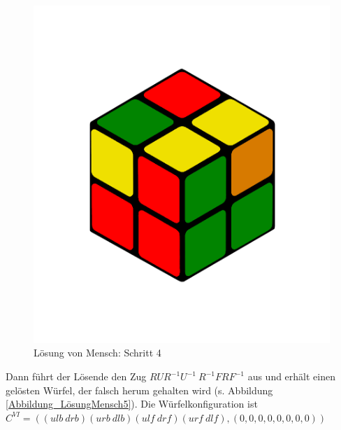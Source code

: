 \documentclass[12pt,a4paper, usenames, dvipsnames]{article}
\theoremstyle{mystyle}
\theoremstyle{definition}
\begin{document}
\begin{figure}[H]
\centering
\includegraphics[scale=0.12]{menschSchritt4.png}
\caption[Lösung von Mensch: Schritt 4]{Lösung von Mensch: Schritt 4}
\label{Abbildung_LösungMensch4}
\end{figure} 

Dann führt der Lösende den Zug $RUR^{-1}U^{-1} \ R^{-1}FRF^{-1}$ aus \cite{RF2} und erhält einen gelösten Würfel, der falsch herum gehalten wird (s. Abbildung \ref{Abbildung_LösungMensch5}). Die Würfelkonfiguration ist $ C^{VI} = (( \textit{ulb} \ \textit{drb} )( \textit{urb} \ \textit{dlb} )( \textit{ulf} \ \textit{drf} )( \textit{urf} \ \textit{dlf} ), (0,0,0,0,0,0,0,0))$
\end{document}
